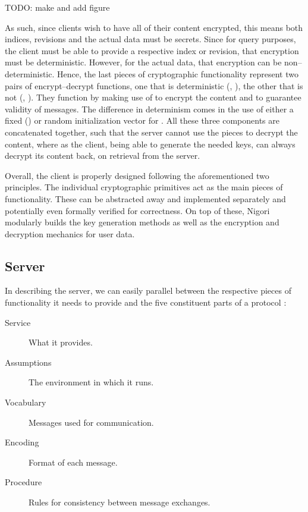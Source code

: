TODO: make and add figure

As such, since clients wish to have all of their content encrypted, this means both indices, revisions and the actual data must be secrets.
Since for query purposes, the client must be able to provide a respective index or revision, that encryption must be deterministic.
However, for the actual data, that encryption can be non--deterministic.
Hence, the last pieces of cryptographic functionality represent two pairs of encrypt--decrypt functions, one that is deterministic (, ), the other that is not (, ).
They function by making use of  to encrypt the content and  to guarantee validity of messages.
The difference in determinism comes in the use of either a fixed () or random initialization vector for .
All these three components are concatenated together, such that the server cannot use the pieces to decrypt the content, where as the client, being able to generate the needed keys, can always decrypt its content back, on retrieval from the server.

Overall, the client is properly designed following the aforementioned two principles.
The individual cryptographic primitives act as the main pieces of functionality.
These can be abstracted away and implemented separately and potentially even formally verified for correctness.
On top of these, Nigori modularly builds the key generation methods as well as the encryption and decryption mechanics for user data.

\subsection{Server}
In describing the server, we can easily parallel between the respective pieces of functionality it needs to provide and the five constituent parts of a protocol \cite{ProtocolDesign}:
\begin{description}
  \item[Service] What it provides.
  \item[Assumptions] The environment in which it runs.
  \item[Vocabulary] Messages used for communication.
  \item[Encoding] Format of each message.
  \item[Procedure] Rules for consistency between message exchanges.
\end{description}

